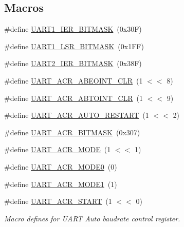 \subsection*{Macros}
\begin{DoxyCompactItemize}
\item 
\#define \hyperlink{group__UART__17XX__40XX_ga145046fd9bd1d318acffd4770a7432ec}{U\+A\+R\+T1\+\_\+\+I\+E\+R\+\_\+\+B\+I\+T\+M\+A\+SK}~(0x30\+F)
\item 
\#define \hyperlink{group__UART__17XX__40XX_gad567d8ee9c41def9dea3d84c4633ac27}{U\+A\+R\+T1\+\_\+\+L\+S\+R\+\_\+\+B\+I\+T\+M\+A\+SK}~(0x1\+F\+F)
\item 
\#define \hyperlink{group__UART__17XX__40XX_gaab8a4f7c6e8d2cf24b5f7d58cc16f8f7}{U\+A\+R\+T2\+\_\+\+I\+E\+R\+\_\+\+B\+I\+T\+M\+A\+SK}~(0x38\+F)
\item 
\#define \hyperlink{group__UART__17XX__40XX_ga77450ebf0f86b6b7ea363927f0cd40c2}{U\+A\+R\+T\+\_\+\+A\+C\+R\+\_\+\+A\+B\+E\+O\+I\+N\+T\+\_\+\+C\+LR}~(1 $<$$<$ 8)
\item 
\#define \hyperlink{group__UART__17XX__40XX_ga2e12222f359d7a5a41668cd729b0731d}{U\+A\+R\+T\+\_\+\+A\+C\+R\+\_\+\+A\+B\+T\+O\+I\+N\+T\+\_\+\+C\+LR}~(1 $<$$<$ 9)
\item 
\#define \hyperlink{group__UART__17XX__40XX_ga20674ae8e687d2161ef3fd88f2649036}{U\+A\+R\+T\+\_\+\+A\+C\+R\+\_\+\+A\+U\+T\+O\+\_\+\+R\+E\+S\+T\+A\+RT}~(1 $<$$<$ 2)
\item 
\#define \hyperlink{group__UART__17XX__40XX_gae83190d58b42771ee951dfe88aada715}{U\+A\+R\+T\+\_\+\+A\+C\+R\+\_\+\+B\+I\+T\+M\+A\+SK}~(0x307)
\item 
\#define \hyperlink{group__UART__17XX__40XX_ga706e927ee7abf7027eb88b1e13dd2a92}{U\+A\+R\+T\+\_\+\+A\+C\+R\+\_\+\+M\+O\+DE}~(1 $<$$<$ 1)
\item 
\#define \hyperlink{group__UART__17XX__40XX_ga31933a99dfe9a8afac45c1f26b0cf021}{U\+A\+R\+T\+\_\+\+A\+C\+R\+\_\+\+M\+O\+D\+E0}~(0)
\item 
\#define \hyperlink{group__UART__17XX__40XX_ga25d690e49a3ccc696e031e8a1480dc1d}{U\+A\+R\+T\+\_\+\+A\+C\+R\+\_\+\+M\+O\+D\+E1}~(1)
\item 
\#define \hyperlink{group__UART__17XX__40XX_gaf6a6a4cb65edff2871ba48d3f2b445dc}{U\+A\+R\+T\+\_\+\+A\+C\+R\+\_\+\+S\+T\+A\+RT}~(1 $<$$<$ 0)
\begin{DoxyCompactList}\small\item\em Macro defines for U\+A\+RT Auto baudrate control register. \end{DoxyCompactList}\item 
$$
\end{DoxyCompactItemize}
